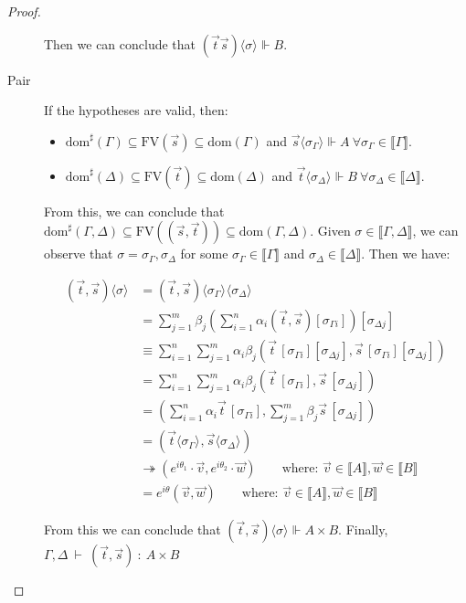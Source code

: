\documentclass[runningheads,orivec]{llncs}
\newcommand\ansubst[2]{\ensuremath{\langle #1 \rangle_{#2}}}
\newcommand\dom[1]{\mathrm{dom}(#1)}
\newcommand\sdom[1]{\mathrm{dom}^{\sharp}(#1)}
\newcommand\FV[1]{\mathrm{FV}(#1)}
\def\Pair#1#2{(#1,#2)} %
\def\eval{\twoheadrightarrow}
\def\sem#1{\llbracket#1\rrbracket}
\def\TYP#1#2#3{#1~{\vdash}~#2~{:}~#3}
\def\real{\Vdash}
\begin{document}
\begin{proof}
\begin{description}
    Then we can conclude that $(\vec{t}\vec{s})\ansubst{\sigma}{}\real B$.
    
    \item[Pair] If the hypotheses are valid, then:

    \begin{itemize}
        \item $\sdom{\Gamma}\subseteq \FV{\vec s}\subseteq \dom{\Gamma}$ and $\vec s \ansubst{\sigma_\Gamma}{}\Vdash A\ \forall \sigma_\Gamma\in\sem{\Gamma}$.
        \item $\sdom{\Delta}\subseteq \FV{\vec t}\subseteq \dom{\Delta}$ and $\vec t\ansubst{\sigma_\Delta}{}\Vdash B\ \forall \sigma_\Delta\in\sem{\Delta}$.
    \end{itemize}
    
    From this, we can conclude that $\sdom{\Gamma,\Delta}\subseteq \FV{(\vec s, \vec t)}\subseteq \dom{\Gamma,\Delta}$. Given $\sigma\in\sem{\Gamma,\Delta}$, we can observe that $\sigma=\sigma_\Gamma,\sigma_\Delta$ for some  $\sigma_\Gamma\in\sem{\Gamma}$ and $\sigma_\Delta\in\sem{\Delta}$. Then we have:

    \begin{align*}
        \Pair{\vec{t}}{\vec{s}}\ansubst{\sigma}{} &= \Pair{\vec{t}}{\vec{s}}\ansubst{\sigma_\Gamma}{}\ansubst{\sigma_\Delta}{}\\
        &=\sum_{j=1}^{m} \beta_j (\sum_{i=1}^{n} \alpha_i \Pair{\vec{t}}{\vec{s}}[\sigma_{\Gamma i}])[\sigma_{\Delta j}]\\
        &\equiv\sum_{i=1}^{n}\sum_{j=1}^{m} \alpha_i \beta_j \Pair{\vec{t}\,[\sigma_{\Gamma i}][\sigma_{\Delta j}]}{\vec{s}\,[\sigma_{\Gamma i}][\sigma_{\Delta j}]}\\
        &=\sum_{i=1}^{n}\sum_{j=1}^{m} \alpha_i \beta_j \Pair{\vec{t}\,[\sigma_{\Gamma i}]}{\vec{s}\,[\sigma_{\Delta j}]}\\
        &=\Pair{\sum_{i=1}^{n} \alpha_i \vec{t}\, [\sigma_{\Gamma i}]}{\sum_{j=1}^{m} \beta_j \vec{s}\, [\sigma_{\Delta j}]}\\
        &=\Pair{\vec{t}\ansubst{\sigma_\Gamma}{}}{\vec{s}\ansubst{\sigma_\Delta}{}}\\
        &\eval \Pair{e^{i\theta_1}\cdot\vec v}{e^{i\theta_2}\cdot\vec w}\qquad\text{where: }\vec{v}\in\sem{A}, \vec{w}\in\sem{B}\\
        &= e^{i\theta} \Pair{\vec{v}}{\vec{w}}\qquad\text{where: }\vec{v}\in\sem{A},\vec{w}\in\sem{B}
    \end{align*}
    
    From this we can conclude that $\Pair{\vec t}{\vec{s}}\ansubst{\sigma}{}\real A\times B$. Finally, $\TYP{\Gamma,\Delta}{\Pair{\vec{t}}{\vec{s}}}{A\times B}$
    

\end{description}
\end{proof}
\end{document}
